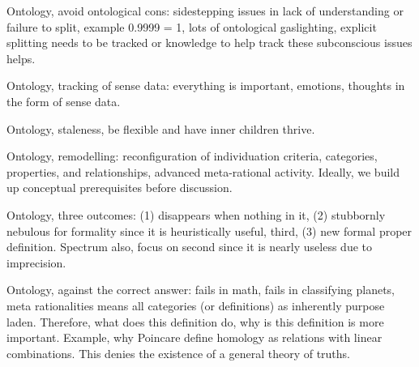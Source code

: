 \documentclass[10pt,twocolumn]{article}
\begin{document}
Ontology, avoid ontological cons: sidestepping issues in lack of understanding or failure to split, example 0.9999 = 1, lots of ontological gaslighting, explicit splitting needs to be tracked or knowledge to help track these subconscious issues helps.

Ontology, tracking of sense data: everything is important, emotions, thoughts in the form of sense data.

Ontology, staleness, be flexible and have inner children thrive.

Ontology, remodelling: reconfiguration of individuation criteria, categories, properties, and relationships, advanced meta-rational activity. Ideally, we build up conceptual prerequisites before discussion.

Ontology, three outcomes: (1) disappears when nothing in it, (2) stubbornly nebulous for formality since it is heuristically useful, third, (3) new formal proper definition. Spectrum also, focus on second since it is nearly useless due to imprecision.

Ontology, against the correct answer: fails in math, fails in classifying planets, meta rationalities means all categories (or definitions) as inherently purpose laden. Therefore, what does this definition do, why is this definition is more important. Example, why Poincare define homology as relations with linear combinations. This denies the existence of a general theory of truths.


\end{document}
